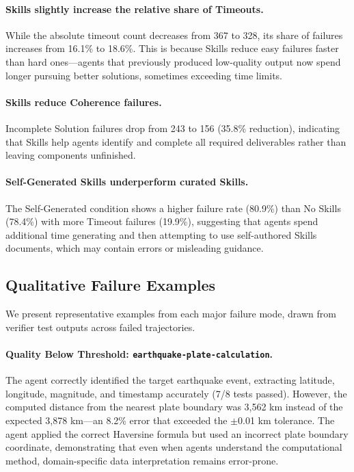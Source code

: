 \paragraph{Skills slightly increase the relative share of Timeouts.}
While the absolute timeout count decreases from 367 to 328, its share of failures increases from 16.1\% to 18.6\%. This is because Skills reduce easy failures faster than hard ones---agents that previously produced low-quality output now spend longer pursuing better solutions, sometimes exceeding time limits.

\paragraph{Skills reduce Coherence failures.}
Incomplete Solution failures drop from 243 to 156 (35.8\% reduction), indicating that Skills help agents identify and complete all required deliverables rather than leaving components unfinished.

\paragraph{Self-Generated Skills underperform curated Skills.}
The Self-Generated condition shows a higher failure rate (80.9\%) than No Skills (78.4\%) with more Timeout failures (19.9\%), suggesting that agents spend additional time generating and then attempting to use self-authored Skills documents, which may contain errors or misleading guidance.

\subsection{Qualitative Failure Examples}
\label{app:failure-examples}

We present representative examples from each major failure mode, drawn from verifier test outputs across failed trajectories.

\paragraph{Quality Below Threshold: \texttt{earthquake-plate-calculation}.}
The agent correctly identified the target earthquake event, extracting latitude, longitude, magnitude, and timestamp accurately (7/8 tests passed). However, the computed distance from the nearest plate boundary was 3,562 km instead of the expected 3,878 km---an 8.2\% error that exceeded the $\pm$0.01 km tolerance. The agent applied the correct Haversine formula but used an incorrect plate boundary coordinate, demonstrating that even when agents understand the computational method, domain-specific data interpretation remains error-prone.

